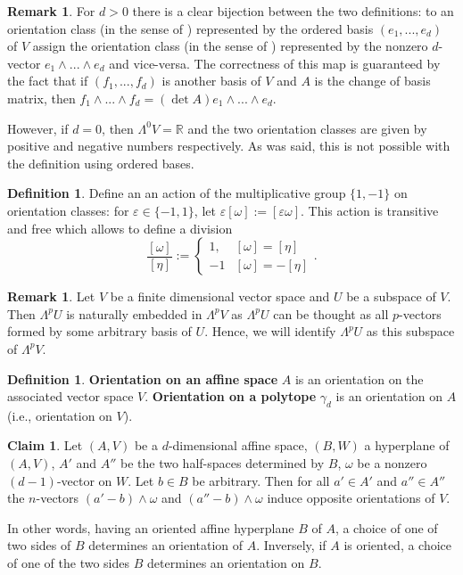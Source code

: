 \documentclass{elsarticle}
\theoremstyle{definition}
\newtheorem{claim}[theorem]{Claim}
\newtheorem{definition}[theorem]{Definition}
\newtheorem{remark}[theorem]{Remark}
\newcommand{\R}{\mathbb{R}} %
\begin{document}
\begin{remark}
  For $d > 0$ there is a clear bijection between the two definitions: to an orientation class (in the sense of ) represented by the ordered basis $(e_1, ..., e_d)$ of $V$ assign the orientation class (in the sense of ) represented by the nonzero $d$-vector $e_1 \wedge ... \wedge e_d$ and vice-versa. The correctness of this map is guaranteed by the fact that if $(f_1, ..., f_d)$ is another basis of $V$ and $A$ is the change of basis matrix, then $f_1 \wedge ... \wedge f_d = (\det A) e_1 \wedge ... \wedge e_d.$
  
  However, if $d = 0$, then $\Lambda^0 V = \R$ and the two orientation classes are given by positive and negative numbers respectively. As was said, this is not possible with the definition using ordered bases.
\end{remark}
\begin{definition}
  Define an an action of the multiplicative group $\{1, -1\}$ on orientation classes: for $\varepsilon \in \{-1, 1\}$, let $\varepsilon [\omega] := [\varepsilon \omega]$. This action is transitive and free which allows to define a division
  \begin{equation}
    \frac{[\omega]}{[\eta]} := 
      \begin{cases}
        1, & [\omega] = [\eta] \\
        -1 & [\omega] = - [\eta]
      \end{cases}.
  \end{equation}
\end{definition}
\begin{remark} 
  Let $V$ be a finite dimensional vector space and $U$ be a subspace of $V.$ Then $\Lambda^p U$ is naturally embedded in $\Lambda^p V$ as $\Lambda^p U$ can be thought as all $p$-vectors formed by some arbitrary basis of $U$. Hence, we will identify $\Lambda^p U$ as this subspace of $\Lambda^p V.$
\end{remark}
\begin{definition}
  \textbf{Orientation on an affine space} $A$ is an orientation on the associated vector space $V$. \textbf{Orientation on a polytope} $\gamma_d$ is an orientation on $A$ (i.e., orientation on $V$).
\end{definition}
\begin{claim}
  Let $(A,V)$ be a $d$-dimensional affine space, $(B,W)$ a hyperplane of $(A,V)$, $A'$ and $A''$ be the two half-spaces determined by $B$, $\omega$ be a nonzero $(d - 1)$-vector on $W.$ Let $b \in B$ be arbitrary. Then for all $a' \in A'$ and $a'' \in A''$ the $n$-vectors $(a' - b) \wedge \omega$ and $(a'' - b) \wedge \omega$ induce opposite orientations of $V$.
\end{claim}
In other words, having an oriented affine hyperplane $B$ of $A$, a choice of one of two sides of $B$ determines an orientation of $A$. Inversely, if $A$ is oriented, a choice of one of the two sides $B$ determines an orientation on $B$.
\end{document}
